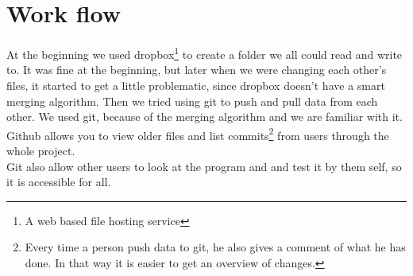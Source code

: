 \chapter{Work flow}
At the beginning we used dropbox\footnote{A web based file hosting service} to create a folder we all could read and write to. It was fine at the beginning, but later when we were changing each other's files, it started to get a little problematic, since dropbox doesn't have a smart merging algorithm.
Then we tried using git to push and pull data from each other. We used git, because of the merging algorithm and we are familiar with it.\\
Github allows you to view older files and list commits\footnote{Every time a person push data to git, he also gives a comment of what he has done. In that way it is easier to get an overview of changes.} from users through the whole project.\\
Git also allow other users to look at the program and and test it by them self, so it is accessible for all.